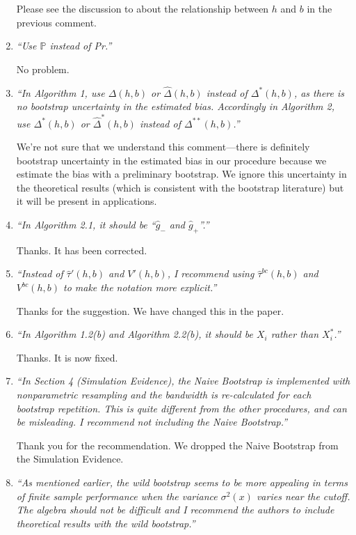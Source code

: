 \documentclass[12pt,fleqn]{article}
\begin{document}
\begin{enumerate}
Please see the discussion to about the relationship between $h$ and $b$ in the previous comment.

\item \textit{``Use $\mathbb{P}$ instead of Pr.''}

No problem.

\item \textit{``In Algorithm 1, use $\Delta(h,b)$ or $\hat{\Delta}(h,b)$ instead of $\Delta^{*}(h,b)$, as there is no bootstrap uncertainty in the estimated bias. Accordingly in Algorithm 2, use $\Delta^{*}(h,b)$ or $\hat{\Delta}^{*}(h,b)$ instead of $\Delta^{**}(h,b)$.''}

We're not sure that we understand this comment---there is definitely bootstrap
uncertainty in the estimated bias in our procedure because we estimate the
bias with a preliminary bootstrap. We ignore this uncertainty in the theoretical
results (which is consistent with the bootstrap literature) but it will be
present in applications.

\item \textit{``In Algorithm 2.1, it should be ``$\hat{g}_{-}$ and $\hat{g}_{+}$''.''}
 
 Thanks. It has been corrected.

\item \textit{``Instead of $\hat{\tau}'(h,b)$ and $V'(h,b)$, I recommend using $\hat{\tau}^{bc}(h,b)$ and $V^{bc}(h,b)$ to make the notation more explicit.''}

Thanks for the suggestion. We have changed this in the paper.

\item \textit{``In Algorithm 1.2(b) and Algorithm 2.2(b), it should be $X_{i}$ rather than $X^{*}_{i}$.''}
 
Thanks. It is now fixed.

\item \textit{``In Section 4 (Simulation Evidence), the Naive Bootstrap is implemented with nonparametric resampling and the bandwidth is re-calculated for each bootstrap repetition.
This is quite different from the other procedures, and can be misleading. I recommend not including the Naive Bootstrap.''}

Thank you for the recommendation. We dropped the Naive Bootstrap from the Simulation Evidence.

\item \textit{``As mentioned earlier, the wild bootstrap seems to be more appealing in terms of finite sample performance when the variance $\sigma^{2}(x)$ varies near the cutoff. The algebra should not be difficult and I recommend the authors to include theoretical results with the wild bootstrap.''}


\end{enumerate}
\end{document}
